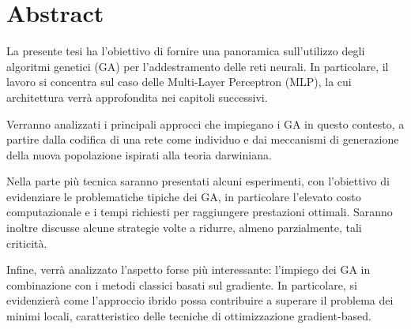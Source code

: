 \chapter*{Abstract}
La presente tesi ha l’obiettivo di fornire una panoramica sull’utilizzo degli algoritmi genetici (GA) per l’addestramento delle reti neurali. In particolare, il lavoro si concentra sul caso delle Multi-Layer Perceptron (MLP), la cui architettura verrà approfondita nei capitoli successivi.

Verranno analizzati i principali approcci che impiegano i GA in questo contesto, a partire dalla codifica di una rete come individuo e dai meccanismi di generazione della nuova popolazione ispirati alla teoria darwiniana.

Nella parte più tecnica saranno presentati alcuni esperimenti, con l’obiettivo di evidenziare le problematiche tipiche dei GA, in particolare l’elevato costo computazionale e i tempi richiesti per raggiungere prestazioni ottimali. Saranno inoltre discusse alcune strategie volte a ridurre, almeno parzialmente, tali criticità.

Infine, verrà analizzato l’aspetto forse più interessante: l’impiego dei GA in combinazione con i metodi classici basati sul gradiente. In particolare, si evidenzierà come l’approccio ibrido possa contribuire a superare il problema dei minimi locali, caratteristico delle tecniche di ottimizzazione gradient-based.